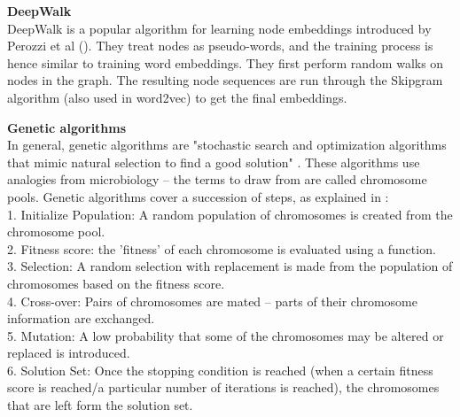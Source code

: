 \textbf{DeepWalk}\\
DeepWalk is a popular algorithm for learning node embeddings introduced by Perozzi et al (\cite{PerozziAS14}). They treat nodes as pseudo-words, and the training process is hence similar to training word embeddings. They first perform random walks on nodes in the graph. The resulting node sequences are run through the Skipgram algorithm (also used in word2vec) to get the final embeddings.

\textbf{Genetic algorithms}\\
In general, genetic algorithms are "stochastic search and optimization algorithms that mimic natural selection to find a good solution" \cite{Mueller17}. These algorithms use analogies from microbiology -- the terms to draw from are called chromosome pools. 
Genetic algorithms cover a succession of steps, as explained in \cite{Mueller17}:\\
1. Initialize Population: A random population of chromosomes is created from the chromosome pool.\\
2. Fitness score: the 'fitness' of each chromosome is evaluated using a function.\\
3. Selection: A random selection with replacement is made from the population of chromosomes based on the fitness score.\\
4. Cross-over: Pairs of chromosomes are mated -- parts of their chromosome information are exchanged.\\
5. Mutation: A low probability that some of the chromosomes may be altered or replaced is introduced.\\
6. Solution Set: Once the stopping condition is reached (when a certain fitness score is reached/a particular number of iterations is reached), the chromosomes that are left form the solution set.